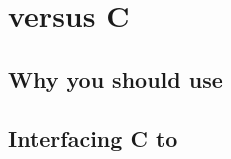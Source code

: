 %
%
%
%
%

\chapter{\cpp versus C}

\section{Why you should use \cpp}

\section{Interfacing C to \cpp}
